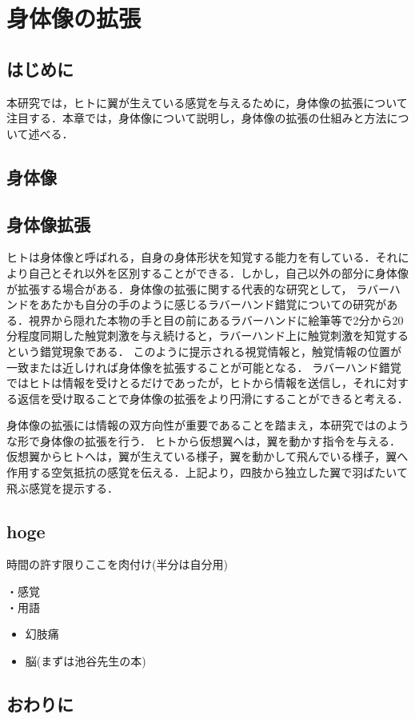 \chapter[身体像の拡張]%
        {身体像の拡張}

\section{はじめに}
    本研究では，ヒトに翼が生えている感覚を与えるために，身体像の拡張について注目する．本章では，身体像について説明し，身体像の拡張の仕組みと方法について述べる．

\section{身体像}

\section{身体像拡張}
    ヒトは身体像と呼ばれる，自身の身体形状を知覚する能力を有している．それにより自己とそれ以外を区別することができる．しかし，自己以外の部分に身体像が拡張する場合がある．身体像の拡張に関する代表的な研究として，
    ラバーハンドをあたかも自分の手のように感じるラバーハンド錯覚についての研究がある\cite{botvinick1998rubber}．視界から隠れた本物の手と目の前にあるラバーハンドに絵筆等で2分から20分程度同期した触覚刺激を与え続けると，ラバーハンド上に触覚刺激を知覚するという錯覚現象である．
    このように提示される視覚情報と，触覚情報の位置が一致または近しければ身体像を拡張することが可能となる．
    ラバーハンド錯覚ではヒトは情報を受けとるだけであったが，ヒトから情報を送信し，それに対する返信を受け取ることで身体像の拡張をより円滑にすることができると考える．

    身体像の拡張には情報の双方向性が重要であることを踏まえ，本研究ではのような形で身体像の拡張を行う．
    ヒトから仮想翼へは，翼を動かす指令を与える．仮想翼からヒトへは，翼が生えている様子，翼を動かして飛んでいる様子，翼へ作用する空気抵抗の感覚を伝える．上記より，四肢から独立した翼で羽ばたいて飛ぶ感覚を提示する．\\


\section{hoge}
時間の許す限りここを肉付け(半分は自分用)

・感覚\\
・用語\\



\begin{itemize}
\item 幻肢痛
\item 脳(まずは池谷先生の本)
\end{itemize}

\section{おわりに}